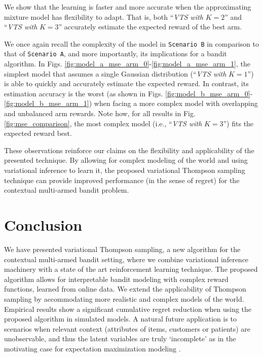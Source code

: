\documentclass{article}
\newcommand{\ie}{i.e., }
\begin{document}
We show that the learning is faster and more accurate when the approximating mixture model has flexibility to adapt. That is, both ``\textit{VTS with }$K=2$'' and ``\textit{VTS with }$K=3$'' accurately estimate the expected reward of the best arm.

We once again recall the complexity of the model in \texttt{Scenario B} in comparison to that of \texttt{Scenario A}, and more importantly, its implications for a bandit algorithm. In Figs. \ref{fig:model_a_mse_arm_0}-\ref{fig:model_a_mse_arm_1}, the simplest model that assumes a single Gaussian distribution (``\textit{VTS with }$K=1$'') is able to quickly and accurately estimate the expected reward. In contrast, its estimation accuracy is the worst (as shown in Figs. \ref{fig:model_b_mse_arm_0}-\ref{fig:model_b_mse_arm_1}) when facing a more complex model with overlapping and unbalanced arm rewards. Note how, for all results in Fig. \ref{fig:mse_comparison}, the most complex model (\ie ``\textit{VTS with }$K=3$'') fits the expected reward best.

These observations reinforce our claims on the flexibility and applicability of the presented technique. By allowing for complex modeling of the world and using variational inference to learn it, the proposed variational Thompson sampling technique can provide improved performance (in the sense of regret) for the contextual multi-armed bandit problem.

\section{Conclusion}
\label{sec:conclusion}

We have presented variational Thompson sampling, a new algorithm for the contextual multi-armed bandit setting, where we combine variational inference machinery with a state of the art reinforcement learning technique. The proposed algorithm allows for interpretable bandit modeling with complex reward functions, learned from online data. We extend the applicability of Thompson sampling by accommodating more realistic and complex models of the world. Empirical results show a significant cumulative regret reduction when using the proposed algorithm in simulated models. A natural future application is to scenarios when relevant context (attributes of items, customers or patients) are unobservable, and thus the latent variables are truly `incomplete' as in the motivating case for expectation maximization modeling \cite{j-Dempster1977}.
\end{document}
